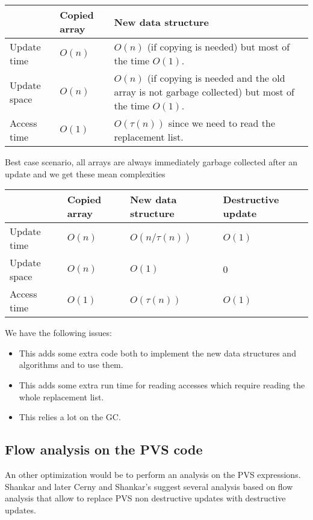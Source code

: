 \documentclass[12pt,a4paper]{article}
\begin{document}
\begin{center}
\begin{tabular}{|l|l|p{10cm}|}
\hline
 & Copied array & New data structure \\ \hline
Update time & $O(n)$ & $O(n)$ (if copying is needed) but most of the time $O(1)$.  \\ \hline
Update space & $O(n)$ & $O(n)$ (if copying is needed and the old array is not garbage collected) but most of the time $O(1)$. \\ \hline
Access time & $O(1)$ & $O(\tau(n))$ since we need to read the replacement list. \\ \hline
\end{tabular}
\end{center}
Best case scenario, all arrays are always immediately garbage collected after an update and we get these mean complexities
\begin{center}
\begin{tabular}{|l|l|p{4.8cm}|p{4.8cm}|}
\hline
 & Copied array & New data structure & Destructive update \\ \hline
Update time & $O(n)$ & $O(n / \tau(n) )$ & $O(1)$  \\ \hline
Update space & $O(n)$ & $O(1)$ & $0$\\ \hline
Access time & $O(1)$ & $O(\tau(n))$ & $O(1)$ \\ \hline
\end{tabular}
\end{center}

We have the following issues:
\begin{itemize}
\item This adds some extra code both to implement the new data structures and algorithms and to use them.
\item This adds some extra run time for reading accesses which require reading the whole replacement list.
\item This relies a lot on the GC.
\end{itemize}


\subsection{Flow analysis on the PVS code}

An other optimization would be to perform an analysis on the PVS expressions. Shankar \cite{shankar02} and later Cerny and Shankar's \cite{pavol} suggest several analysis based on flow analysis that allow to replace PVS non destructive updates with destructive updates.\\
\end{document}
